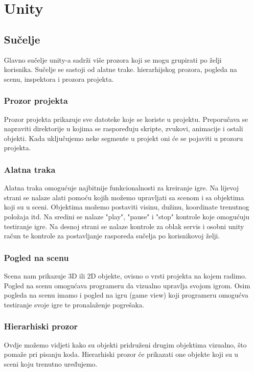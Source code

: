 \section{Unity}
\subsection{Sučelje}
Glavno sučelje unity-a sadrži više prozora koji se mogu grupirati po želji korisnika. Sučelje se sastoji od alatne trake. hierarhijskog prozora, pogleda na scenu, inspektora i prozora projekta.

\subsubsection{Prozor projekta}
Prozor projekta prikazuje sve datoteke koje se koriste u projektu. Preporučava se napraviti direktorije u kojima se raspoređuju skripte, zvukovi, animacije i ostali objekti. Kada uključujemo neke segmente u projekt oni će se pojaviti u prozoru projekta.


\subsubsection{Alatna traka}
Alatna traka omogućuje najbitnije funkcionalnosti za kreiranje igre. Na lijevoj strani se nalaze alati pomoću kojih možemo upravljati sa scenom i sa objektima koji su u sceni. Objektima možemo postaviti visinu, dužinu, koordinate trenutnog položaja itd. Na sredini se nalaze "play", "pause" i "stop" kontrole koje omogućuju testiranje igre. Na desnoj strani se nalaze kontrole za oblak servis i osobni unity račun te kontrole za postavljanje rasporeda sučelja po korisnikovoj želji.

\subsubsection{Pogled na scenu}
Scena nam prikazuje 3D ili 2D objekte, ovisno o vrsti projekta na kojem radimo. Pogled na scenu omogućava programeru da vizualno upravlja svojom igrom. Osim pogleda na scenu imamo i pogled na igru (game view) koji programeru omogućva testiranje svoje igre te pronalaženje pogrešaka.


\subsubsection{Hierarhiski prozor}
Ovdje možemo vidjeti kako su objekti pridruženi drugim objektima vizualno, što pomaže pri pisanju koda. Hierarhiski prozor će prikazati one objekte koji su u sceni koju trenutno uređujemo.

